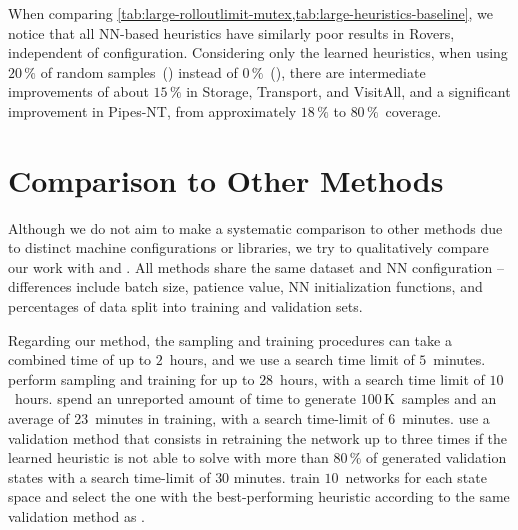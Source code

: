 When comparing \cref{tab:large-rolloutlimit-mutex,tab:large-heuristics-baseline}, we notice that all NN-based heuristics have similarly poor results in Rovers, independent of configuration. Considering only the learned heuristics, when using $20\,\%$ of random samples~(\hnnrs) instead of $0\,\%$~(\hnnl{\rlmeanfx}), there are intermediate improvements of about $15\,\%$ in Storage, Transport, and VisitAll, and a significant improvement in Pipes-NT, from approximately $18\,\%$ to $80\,\%$~coverage.

\section{Comparison to Other Methods}
\label{sec:large-exps-comparison}

Although we do not aim to make a systematic comparison to other methods due to distinct machine configurations or libraries, we try to qualitatively compare our work with \citet{ferber2022neural} and \citet{otoole2022sampling}. All methods share the same dataset and NN configuration -- differences include batch size, patience value, NN initialization functions, and percentages of data split into training and validation sets.

Regarding our method, the sampling and training procedures can take a combined time of up to $2$~hours, and we use a search time limit of $5$~minutes. \citet{ferber2022neural} perform sampling and training for up to $28$~hours, with a search time limit of $10$~hours. \citet{otoole2022sampling} spend an unreported amount of time to generate $100$\,K~samples and an average of $23$~minutes in training, with a search time-limit of $6$~minutes. \citet{ferber2022neural} use a validation method that consists in retraining the network up to three times if the learned heuristic is not able to solve with \gbfs more than $80\,\%$ of generated validation states with a search time-limit of $30$ minutes. \citet{otoole2022sampling} train $10$~networks for each state space and select the one with the best-performing heuristic according to the same validation method as \citet{ferber2022neural}.

